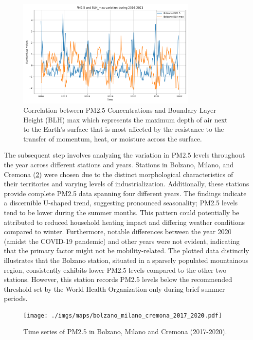 \documentclass[12pt,a4paper]{article}
\begin{document}
\begin{figure}[h]
    \centering
    \includegraphics[width=0.8\textwidth]{./imgs/maps/plot_Bolzano_PM25_BLHmax_years.png}
    \caption{Correlation between PM2.5 Concentrations and Boundary Layer Height (BLH) max
     which represents the maximum depth of air next to the Earth’s surface that is most affected by the
    resistance to the transfer of momentum, heat, or moisture across the surface.}
    \label{fig:pm_blh_correlation}
\end{figure} 

\vspace{12pt}
The subsequent step involves analyzing the variation in PM2.5 levels throughout the year across different stations and years. Stations in Bolzano, Milano, and Cremona (\cref{fig:bolzano_milano_cremona_2017_2020}) were chosen due to the distinct morphological characteristics of their territories and varying levels of industrialization. Additionally, these stations provide complete PM2.5 data spanning four different years. The findings indicate a discernible U-shaped trend, suggesting pronounced seasonality; PM2.5 levels tend to be lower during the summer months. This pattern could potentially be attributed to reduced household heating impact and differing weather conditions compared to winter.
Furthermore, notable differences between the year 2020 (amidst the COVID-19 pandemic) and other years were not evident, indicating that the primary factor might not be mobility-related. The plotted data distinctly illustrates that the Bolzano station, situated in a sparsely populated mountainous region, consistently exhibits lower PM2.5 levels compared to the other two stations. However, this station records PM2.5 levels below the recommended threshold set by the World Health Organization only during brief summer periods.

\begin{figure}[h]
    \centering
    \texttt{[image: ./imgs/maps/bolzano\_milano\_cremona\_2017\_2020.pdf]}
    \caption{Time series of PM2.5 in Bolzano, Milano and Cremona (2017-2020).}
    \label{fig:bolzano_milano_cremona_2017_2020}
\end{figure} 
\end{document}
